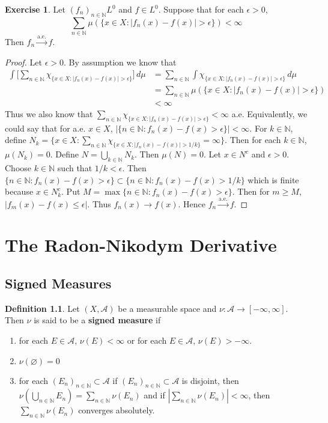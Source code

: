 \documentclass{book}
\theoremstyle{definition}
\newtheorem{defn}[definition]{Definition}
\newtheorem{ex}[definition]{Exercise}
\newcommand{\ep}{\epsilon}
\newcommand{\N}{\mathbb{N}}
\newcommand{\MA}{\mathcal{A}}
\newcommand{\lex}[1]{\label{ex:#1}}
\newcommand{\ld}[1]{\label{defn:#1}}
\DeclareMathOperator*{\0}{\mbf{0}}
\DeclareMathOperator*{\1}{\mbf{1}}
\newcommand{\convt}[1]{\xrightarrow{\text{#1}}}
\newcommand{\dmu}{\, d \mu}
\begin{document}
	
	\begin{ex} \lex{35015} 
		Let $(f_n)_{n \in \N} L^0$ and $f \in L^0$. Suppose that for each $\ep >0$, $$\sum_{n \in \N}\mu(\{x \in X: |f_n(x)-f(x)| > \ep\}) < \infty$$
		Then $f_n \convt{a.e.} f$.
	\end{ex}
	
	\begin{proof}
		Let $\ep>0$. By assumption we know that
		\begin{align*}
			\int \bigg[ \sum_{n \in \N}\chi_{\{x \in X: |f_n(x)-f(x)| > \ep\}}\bigg] \dmu 
			&= \sum_{n \in \N}\int \chi_{\{x \in X: |f_n(x)-f(x)| > \ep\}}\dmu\\
			&=\sum_{n \in \N}\mu(\{x \in X: |f_n(x)-f(x)| > \ep\})\\
			& < \infty
		\end{align*}
		Thus we also know that $\sum_{n \in \N}\chi_{\{x \in X: |f_n(x)-f(x)| > \ep\}} < \infty$ a.e. Equivalently, we could say that for a.e. $x \in X$, $|\{n \in \N: f_n(x) - f(x) > \ep\}| < \infty$. For $k \in \N$, define $N_k = \{x \in X: \sum_{n \in \N}\chi_{\{x \in X: |f_n(x)-f(x)| > 1/k\}} = \infty\}$. Then for each $k \in \N$, $\mu(N_k) = 0$. Define $N = \bigcup_{k \in \N} N_k$. Then $\mu(N) = 0$. Let $x \in N^c$ and $\ep > 0$. Choose $k \in \N$ such that $1/k < \ep$. Then $\{n \in \N: f_n(x) - f(x) > \ep\} \subset \{n \in \N: f_n(x) - f(x) > 1/k\}$ which is finite because $x \in N_k^c$. Put $M = \max\{n \in \N: f_n(x) - f(x) > \ep\}$. Then for $m \geq M$, $|f_m(x) - f(x) \leq \ep|$. Thus $f_n(x) \rightarrow f(x)$. Hence $f_n \convt{a.e.} f$.
	\end{proof}
	
	
	
	
	
	
	
	
	
	
	
	
	
	\newpage
	\chapter{The Radon-Nikodym Derivative}
	
	\section{Signed Measures}
	
	\begin{defn} \ld{41001} 
		Let $(X, \MA)$ be a measurable space and $\nu : \MA \rightarrow [-\infty, \infty]$. Then $\nu$ is said to be a \textbf{signed measure} if 
		\begin{enumerate}
			\item for each $E \in \MA$, $\nu(E) < \infty$ or for each $E \in \MA$, $\nu(E) > -\infty$.
			\item $\nu(\varnothing) = 0$
			\item for each $(E_n)_{n \in \N} \subset \MA$ if $(E_n)_{n \in \N} \subset \MA$ is disjoint, then $\nu(\bigcup\limits_{n \in \N} E_n) = \sum\limits_{n \in \N} \nu(E_n)$ and if $|\sum\limits_{n \in \N} \nu(E_n)| < \infty$, then $\sum\limits_{n \in \N} \nu(E_n)$ converges absolutely.
		\end{enumerate}
	\end{defn}
	
\end{document}
